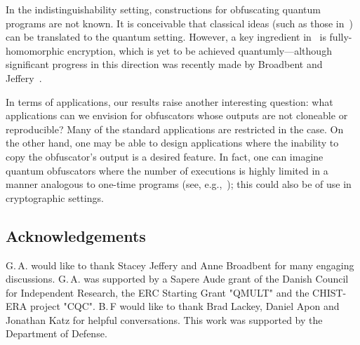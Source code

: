 \documentclass[envcountsame]{llncs}
\numberwithin{equation}{section}
\begin{document}
In the indistinguishability setting, constructions for obfuscating quantum programs are not known. It is conceivable that classical ideas (such as those in~\cite{GGHRSW13}) can be translated to the quantum setting. However, a key ingredient in~\cite{GGHRSW13} is fully-homomorphic encryption, which is yet to be achieved quantumly---although significant progress in this direction was recently made by Broadbent and Jeffery~\cite{BJ15}.

In terms of applications, our results raise another interesting question: what applications can we envision for obfuscators whose outputs are not cloneable or reproducible? Many of the standard applications are restricted in the case. On the other hand, one may be able to design applications where the inability to copy the obfuscator's output is a desired feature. In fact, one can imagine quantum obfuscators where the number of executions is highly limited in a manner analogous to one-time programs (see, e.g.,~\cite{BDG13}); this could also be of use in cryptographic settings.

\subsection*{Acknowledgements}

G.\,A. would like to thank Stacey Jeffery and Anne Broadbent for many engaging discussions. G.\,A. was supported by a Sapere Aude grant of the Danish Council for Independent Research, the ERC Starting Grant "QMULT" and the CHIST-ERA project "CQC". B.\,F would like to thank Brad Lackey, Daniel Apon and Jonathan Katz for helpful conversations.  This work was supported by the Department of Defense.  

\end{document}

